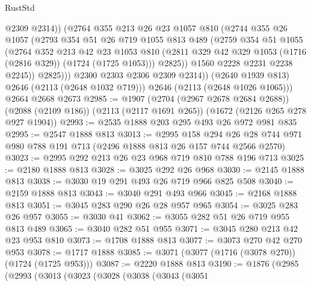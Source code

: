 \begin{lexlean}{RustStd}
\begin{coremodule}
                    @2309
                    @2314))
                (@2764
                  @355
                  @213
                  @26
                  @23
                  @1057
                  @810
                  (@2744
                    @355
                    @26
                    @1057
                    (@2793
                      @354
                      @51
                      @26
                      @719
                      @1055
                      @813
                      @489
                      (@2759
                        @354
                        @51
                        @1055
                        (@2764
                          @352
                          @213
                          @42
                          @23
                          @1053
                          @810
                          (@2811 @329 @42 @329 @1053 (@1716 (@2816 @329)) (@1724 (@1725 @1053)))
                          @2825))
                      @1560
                      @2228
                      @2231
                      @2238
                      @2245))
                  @2825)))
            @2300
            @2303
            @2306
            @2309
            @2314))
        (@2640 @1939 @813)
        @2646
        (@2113 (@2648 @1032 @719)))
      @2646
      (@2113 (@2648 @1026 @1065)))
    @2664
    @2668
    @2673
@2985 := @1907
    (@2704 (@2967 @2678 @2684 @2688))
    (@2088 (@2109 @186))
    (@2113 (@2117 @1691 @265))
    (@1672 (@2126 @265 @278 @927 @1904))
@2993 := @2535 @1888 @203 @295 @493 @26 @972 @981 @835
@2995 := @2547 @1888 @813
@3013 := @2995
    @158
    @294
    @26
    @28
    @744
    @971
    @980
    @788
    @191
    @713
    (@2496 @1888 @813 @26 @157 @744 @2566 @2570)
@3023 := @2995 @292 @213 @26 @23 @968 @719 @810 @788 @196 @713
@3025 := @2180 @1888 @813
@3028 := @3025 @292 @26 @968
@3030 := @2145 @1888 @813
@3038 := @3030 @19 @291 @493 @26 @719 @966 @825 @508
@3040 := @2159 @1888 @813
@3043 := @3040 @291 @493 @966
@3045 := @2168 @1888 @813
@3051 := @3045 @283 @290 @26 @28 @957 @965
@3054 := @3025 @283 @26 @957
@3055 := @3030 @41
@3062 := @3055 @282 @51 @26 @719 @955 @813 @489
@3065 := @3040 @282 @51 @955
@3071 := @3045 @280 @213 @42 @23 @953 @810
@3073 := @1708 @1888 @813
@3077 := @3073 @270 @42 @270 @953
@3078 := @1717 @1888
@3085 := @3071 (@3077 (@1716 (@3078 @270)) (@1724 (@1725 @953)))
@3087 := @2220 @1888 @813
@3190 := @1876
    (@2985
      (@2993
        (@3013
          (@3023
            (@3028
              (@3038
                (@3043
                  (@3051

\end{coremodule}
\end{lexlean}
